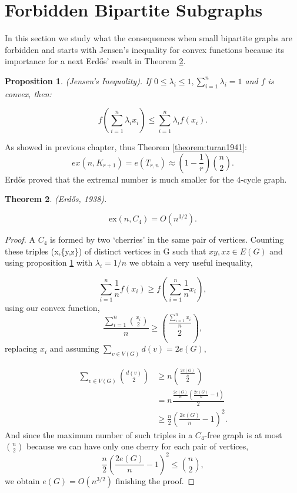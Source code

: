 \documentclass[12pt,twoside,a4paper]{book}
\numberwithin{equation}{section}
\newtheorem{theorem}             {Theorem}[section]
\newtheorem{proposition}[theorem] {Proposition}
\theoremstyle{remark}
\begin{document}
\section{Forbidden Bipartite Subgraphs}
In this section we study what the consequences when small bipartite graphs are forbidden and starts with Jensen's inequality for convex functions because its importance for a next Erd\H{o}s' result in Theorem \ref{theorem: Erdos,1938}.
\begin{proposition}\label{prep:jensen}
(Jensen's Inequality). If $0\leq \lambda_i \leq 1, \sum_{i=1}^n \lambda_i = 1$ and $f$ is convex, then:

$$
f \left( \sum_{i=1}^n \lambda_i x_i\right) \leq \sum_{i=1}^n \lambda_i f (x_i).
$$

\end{proposition}

As showed in previous chapter, thus Theorem \ref{theorem:turan1941}:
$$ ex(n,K_{r+1}) = e(T_{r,n}) \approx \left( 1-\frac{1}{r}\right) \binom{n}{2} .$$
Erd\H{o}s proved that the extremal number is much smaller for the $4$-cycle graph.
 
\begin{theorem} \label{theorem: Erdos,1938}
(Erd\H{o}s, 1938).

$$\text{ex}(n,C_4) = O(n^{3/2}).$$
\end{theorem}

\begin{proof}
A $C_4$ is formed by two `cherries' in the same pair of vertices. Counting these triples (x,\{y,z\}) of distinct vertices in G such that $xy, xz \in E(G)$ and using proposition \ref{prep:jensen} with $\lambda_i = 1/n$ we obtain a very useful inequality,

$$ \sum_{i=1}^n \frac{1}{n} f\left(x_i\right) \geq f\left(\sum_{i=1}^n \frac{1}{n} x_i\right),$$
using our convex function,
$$ \frac{\sum_{i=1}^n \binom{x_i}{2}}{n} \geq \binom{\frac{\sum_{i=1}^n x_i}{n}}{2} ,$$
replacing $x_i$ and assuming $\sum_{v \in V(G)} d(v) = 2e(G),$

\begin{align*}
\sum_{v \in V(G)} \binom{d(v)}{2} &\geq n \binom{\frac{2e(G)}{n}}{2}\\
&= n\frac{\frac{2e(G)}{n}\left( \frac{2e(G)}{n}-1\right)}{2} \\
&\geq \frac{n}{2} \left( \frac{2e(G)}{n} - 1 \right)^2.
\end{align*}
And since the maximum number of such triples in a $C_4$-free graph is at most $\binom{n}{2}$ because we can have only one cherry for each pair of vertices,
$$ \frac{n}{2}\left(\frac{2e(G)}{n} - 1\right)^2 \leq \binom{n}{2},$$
we obtain $e(G) = O(n^{3/2})$ finishing the proof.
\end{proof}
\end{document}
